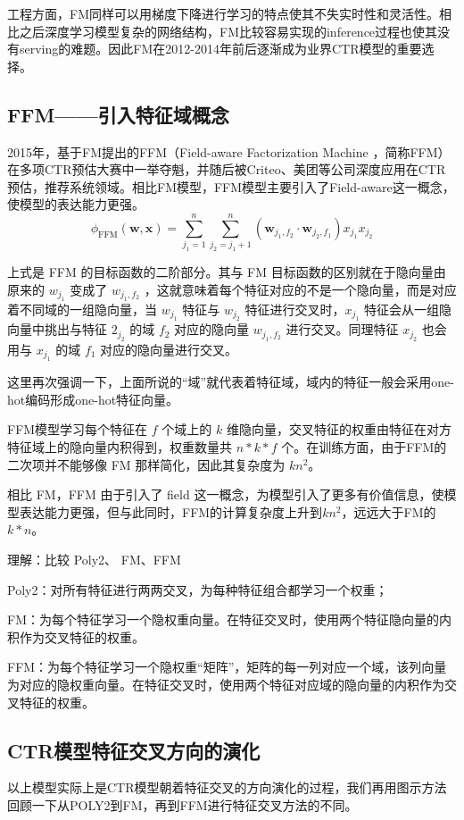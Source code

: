 \documentclass[12pt]{article}
\begin{document}
工程方面，FM同样可以用梯度下降进行学习的特点使其不失实时性和灵活性。相比之后深度学习模型复杂的网络结构，FM比较容易实现的inference过程也使其没有serving的难题。因此FM在2012-2014年前后逐渐成为业界CTR模型的重要选择。

\subsection{FFM——引入特征域概念}
2015年，基于FM提出的FFM（Field-aware Factorization Machine ，简称FFM）在多项CTR预估大赛中一举夺魁，并随后被Criteo、美团等公司深度应用在CTR预估，推荐系统领域。相比FM模型，FFM模型主要引入了Field-aware这一概念，使模型的表达能力更强。
$$
\phi_{\text{FFM}}(\mathbf{w}, \mathbf{x}) = \sum_{j_1=1}^n\sum_{j_2 = j_1 + 1}^n (\mathbf{w}_{j_1, f_2} \cdot \mathbf{w}_{j_2, f_1})x_{j_1}x_{j_2}
$$

上式是 FFM 的目标函数的二阶部分。其与 FM 目标函数的区别就在于隐向量由原来的 $w_{j_1}$ 变成了 $w_{j_1, f_2}$  ，这就意味着每个特征对应的不是一个隐向量，而是对应着不同域的一组隐向量，当 $w_{j_1}$ 特征与 $w_{j_2}$ 特征进行交叉时，$x_{j_1}$ 特征会从一组隐向量中挑出与特征 $2_{j_2}$ 的域 $f_2$ 对应的隐向量 $w_{j_1, f_2}$ 进行交叉。同理特征 $x_{j_2}$ 也会用与 $x_{j_1}$ 的域 $f_1$ 对应的隐向量进行交叉。

这里再次强调一下，上面所说的“域”就代表着特征域，域内的特征一般会采用one-hot编码形成one-hot特征向量。

FFM模型学习每个特征在 $f$ 个域上的 $k$ 维隐向量，交叉特征的权重由特征在对方特征域上的隐向量内积得到，权重数量共 $n*k*f$ 个。在训练方面，由于FFM的二次项并不能够像 FM 那样简化，因此其复杂度为 $kn^2$。

相比 FM，FFM 由于引入了 field 这一概念，为模型引入了更多有价值信息，使模型表达能力更强，但与此同时，FFM的计算复杂度上升到$kn^2$，远远大于FM的 $k*n$。

\begin{framed}
理解：比较 Poly2、 FM、FFM

Poly2：对所有特征进行两两交叉，为每种特征组合都学习一个权重；

FM：为每个特征学习一个隐权重向量。在特征交叉时，使用两个特征隐向量的内积作为交叉特征的权重。

FFM：为每个特征学习一个隐权重“矩阵”，矩阵的每一列对应一个域，该列向量为对应的隐权重向量。在特征交叉时，使用两个特征对应域的隐向量的内积作为交叉特征的权重。
\end{framed}

\subsection{CTR模型特征交叉方向的演化}
以上模型实际上是CTR模型朝着特征交叉的方向演化的过程，我们再用图示方法回顾一下从POLY2到FM，再到FFM进行特征交叉方法的不同。
\end{document}
